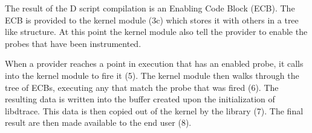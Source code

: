 The result of the D script compilation is an Enabling Code Block
(ECB). The ECB is provided to the kernel module (3c) which stores it
with others in a tree like structure. At this point the kernel module
also tell the provider to enable the probes that have been
instrumented.

When a provider reaches a point in execution that has an enabled
probe, it calls into the kernel module to fire it (5). The kernel
module then walks through the tree of ECBs, executing any that match
the probe that was fired (6). The resulting data is written into the
buffer created upon the initialization of libdtrace. This data is then
copied out of the kernel by the library (7). The final result are then
made available to the end user (8).
